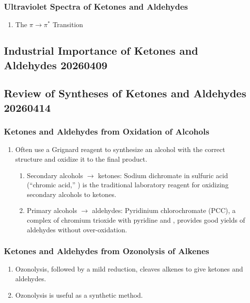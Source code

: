 \subsubsection{Ultraviolet Spectra of Ketones and Aldehydes}

\begin{enumerate}
    \item The $ \pi \rightarrow \pi^* $ Transition
\end{enumerate}

\subsection{Industrial Importance of Ketones and Aldehydes 20260409}

\subsection{Review of Syntheses of Ketones and Aldehydes 20260414}

\subsubsection{Ketones and Aldehydes from Oxidation of Alcohols}

\begin{enumerate}
    \item Often use a Grignard reagent to synthesize an alcohol with the correct structure and oxidize it to the final product.
    \begin{enumerate}
        \item Secondary alcohols $ \rightarrow $ ketones: Sodium dichromate in sulfuric acid (“chromic acid,” ) is the traditional laboratory reagent for oxidizing secondary alcohols to ketones.
        \item Primary alcohols $ \rightarrow $ aldehydes: Pyridinium chlorochromate (PCC), a complex of chromium trioxide with pyridine and , provides good yields of aldehydes without over-oxidation.
    \end{enumerate}
\end{enumerate}

\subsubsection{Ketones and Aldehydes from Ozonolysis of Alkenes}

\begin{enumerate}
    \item Ozonolysis, followed by a mild reduction, cleaves alkenes to give ketones and aldehydes.
    \item Ozonolysis is useful as a synthetic method.
\end{enumerate}

